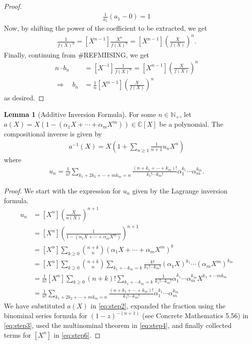\documentclass[a4paper]{article}
\theoremstyle{definition}
\newtheorem{lemma}[definition]{Lemma}
\begin{document}
\begin{proof}
    \begin{align}
        \frac{1}{a_1} \left(a_1 - 0\right) = 1
    \end{align}
    Now, by shifting the power of the coefficient to be extracted, we get
    \begin{align}
        [X^{-1}] \frac{1}{f(X)^n} = [X^{n-1}] \frac{X^n}{f(X)^n} = [X^{n-1}] \left( \frac{X}{f(X)} \right)^n \text{.}
    \end{align}
    Finally, continuing from \#REFMIISING, we get
    \begin{align}
        n \cdot b_n &= [X^{-1}] \frac{1}{f(X)^n} = [X^{n-1}] \left( \frac{X}{f(X)} \right)^n \\
        \Rightarrow \quad b_n &= \frac{1}{n} [X^{n-1}] \left( \frac{X}{f(X)} \right)^n
    \end{align}
    as desired.
\end{proof}
\begin{lemma}[Additive Inversion Formula]
    For some \(n \in \mathbb{N}_+\), let \(a(X) = X(1 - (\alpha_1 X + \cdots + \alpha_m X^m)) \in \mathbb{C}[X]\) be a polynomial. The compositional inverse is given by
    \begin{align}
        a^{-1}(X) = X \left(1 + \sum_{n \geq 1} \frac{1}{n + 1} u_n X^n\right)
    \end{align}
    where
    \begin{align}
        u_n = \frac{1}{n!} \sum_{k_1 + 2k_2 + \cdots + m k_m = n} \frac{(n + k_1 + \cdots + k_m)!}{k_1! \cdots k_m!} \alpha_1^{k_1} \cdots \alpha_m^{k_m} \text{.}
    \end{align}
\end{lemma}
\begin{proof}
    We start with the expression for \(u_n\) given by the Lagrange inversion formula.
    \begin{align}
        u_n &= [X^n] \left(\frac{X}{a(X)} \right)^{n+1}  \label{eq:step1} \\
        &= [X^n] \left(\frac{1}{1 - (\alpha_1 X + \cdots + \alpha_m X^m)}\right)^{n+1} \label{eq:step2} \\
        &= [X^n] \sum_{k \geq 0} \binom{n+k}{n} \left(\alpha_1 X + \cdots + \alpha_m X^m \right)^k \label{eq:step3} \\
        &= [X^n] \sum_{k \geq 0} \binom{n+k}{n} \sum_{k_1 + \cdots k_m = k} \frac{k!}{k_1! \cdots k_m!} (\alpha_1 X)^{k_1} \cdots (\alpha_m X^m)^{k_m} \label{eq:step4} \\
        &= \frac{1}{n!} [X^n] \sum_{k \geq 0} (n + k)! \sum_{k_1 + \cdots k_m = k} \frac{1}{k_1! \cdots k_m!} \alpha_1^{k_1} \cdots \alpha_m^{k_m} X^{k_1 + \cdots m k_m} \label{eq:step5} \\
        &= \frac{1}{n!} \sum_{k_1 + 2k_2 + \cdots + m k_m = n} \frac{(n + k_1 + \cdots + k_m)!}{k_1! \cdots k_m!} \alpha_1^{k_1} \cdots \alpha_m^{k_m} \label{eq:step6}
    \end{align}
    We have substituted \(a(X)\) in \eqref{eq:step2}, expanded the fraction using the binominal series formula for \((1-z)^{-(n+1)}\) (see Concrete Mathematics 5.56) in \eqref{eq:step3}, used the multinominal theorem in \eqref{eq:step4}, and finally collected terms for \([X^n]\) in \eqref{eq:step6}.
\end{proof}
\end{document}
